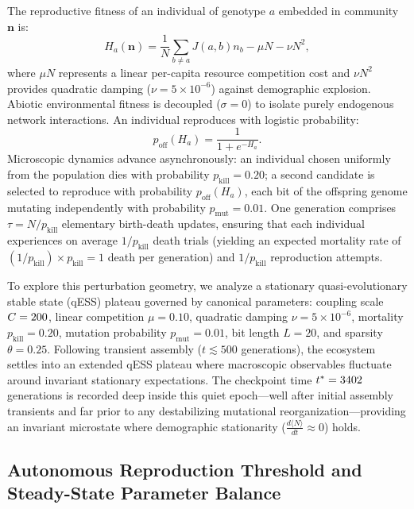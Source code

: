 \documentclass[twocolumn,amsmath,amssymb,aps,pra,10pt,floatfix,nofootinbib]{revtex4-2}
\begin{document}
The reproductive fitness of an individual of genotype $a$ embedded in community $\mathbf{n}$ is:
\begin{equation}
H_a(\mathbf{n}) = \frac{1}{N} \sum_{b \neq a} J(a,b) n_b - \mu N - \nu N^2,
\label{eq:H}
\end{equation}
where $\mu N$ represents a linear per-capita resource competition cost and $\nu N^2$ provides quadratic damping ($\nu = 5 \times 10^{-6}$) against demographic explosion. Abiotic environmental fitness is decoupled ($\sigma = 0$) to isolate purely endogenous network interactions. An individual reproduces with logistic probability:
\begin{equation}
p_{\text{off}}(H_a) = \frac{1}{1 + e^{-H_a}}.
\label{eq:poff}
\end{equation}
Microscopic dynamics advance asynchronously: an individual chosen uniformly from the population dies with probability $p_{\text{kill}} = 0.20$; a second candidate is selected to reproduce with probability $p_{\text{off}}(H_a)$, each bit of the offspring genome mutating independently with probability $p_{\text{mut}} = 0.01$. One generation comprises $\tau = N / p_{\text{kill}}$ elementary birth-death updates, ensuring that each individual experiences on average $1/p_{\text{kill}}$ death trials (yielding an expected mortality rate of $(1/p_{\text{kill}}) \times p_{\text{kill}} = 1$ death per generation) and $1/p_{\text{kill}}$ reproduction attempts.

To explore this perturbation geometry, we analyze a stationary quasi-evolutionary stable state (qESS) plateau governed by canonical parameters: coupling scale $C = 200$, linear competition $\mu = 0.10$, quadratic damping $\nu = 5 \times 10^{-6}$, mortality $p_{\text{kill}} = 0.20$, mutation probability $p_{\text{mut}} = 0.01$, bit length $L = 20$, and sparsity $\theta = 0.25$. Following transient assembly ($t \lesssim 500$ generations), the ecosystem settles into an extended qESS plateau where macroscopic observables fluctuate around invariant stationary expectations. The checkpoint time $t^* = 3402$ generations is recorded deep inside this quiet epoch---well after initial assembly transients and far prior to any destabilizing mutational reorganization---providing an invariant microstate where demographic stationarity ($\frac{d\langle N\rangle}{dt} \approx 0$) holds.

\subsection{Autonomous Reproduction Threshold and Steady-State Parameter Balance}
\end{document}
